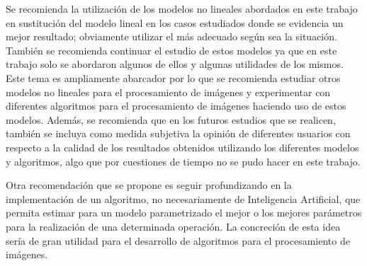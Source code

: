 \begin{recomendations}
    Se recomienda la utilizaci\'on de los modelos no lineales abordados en este trabajo en sustituci\'on del modelo lineal en los casos estudiados donde se evidencia un mejor resultado; obviamente utilizar el m\'as adecuado seg\'un sea la situaci\'on. Tambi\'en se recomienda continuar el estudio de estos modelos ya que en este trabajo solo se abordaron algunos de ellos y algunas utilidades de los mismos. Este tema es ampliamente abarcador por lo que se recomienda estudiar otros modelos no lineales para el procesamiento de im\'agenes y experimentar con diferentes algoritmos para el procesamiento de im\'agenes haciendo uso de estos modelos. Adem\'as, se recomienda que en los futuros estudios que se realicen, tambi\'en se incluya como medida subjetiva la opini\'on de diferentes usuarios con respecto a la calidad de los resultados obtenidos utilizando los diferentes modelos y algoritmos, algo que por cuestiones de tiempo no se pudo hacer en este trabajo.
    
    Otra recomendaci\'on que se propone es seguir profundizando en la implementaci\'on de un algoritmo, no necesariamente de Inteligencia Artificial, que permita estimar para un modelo parametrizado el mejor o los mejores par\'ametros para la realizaci\'on de una determinada operaci\'on. La concreci\'on de esta idea ser\'ia de gran utilidad para el desarrollo de algoritmos para el procesamiento de im\'agenes.
\end{recomendations}
